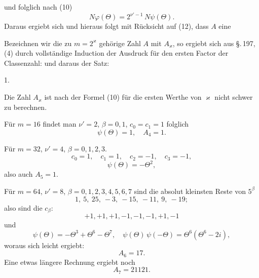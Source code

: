 und folglich nach (10)
\[
N\varphi(\Theta) = 2^{\nu'-1}\,N\psi(\Theta).
\]
Daraus ergiebt sich
und hieraus folgt mit Rücksicht auf (12), dass $A$ eine 

Bezeichnen wir die zu $m = 2^\varkappa$ gehörige Zahl $A$ mit $A_\varkappa$, so
ergiebt sich aus \S.\,197, (4) durch vollständige Induction der
Ausdruck für den ersten Factor der Classenzahl:
und daraus der Satz:

1. 

Die Zahl $A_\varkappa$ ist nach der Formel (10) für die ersten Werthe
von $\varkappa$ nicht schwer zu berechnen.

Für $m = 16$ findet man $\nu' = 2$, $\beta = 0, 1$, $c_0 = c_1 = 1$
folglich
\[
\psi(\Theta) = 1, \quad A_4 = 1.
\]

Für $m = 32$, $\nu' = 4$, $\beta = 0, 1, 2, 3$.
\[
c_0 = 1, \quad c_1 = 1, \quad c_2 = -1, \quad c_3 = -1,
\]
\[
\psi(\Theta) = -\Theta^2,
\]
also auch $A_5 = 1$.

Für $m = 64$, $\nu' = 8$, $\beta = 0, 1, 2, 3, 4, 5, 6, 7$ sind die
absolut kleinsten Reste von $5^\beta$
\[
1,\ 5,\ 25,\ -3,\ -15,\ -11,\ 9,\ -19;
\]
also sind die $c_\beta$:
\[
+1, +1, +1, -1, -1, -1, +1, -1
\]
und
\[
\psi(\Theta) = -\Theta^3 + \Theta^6 - \Theta^7, \quad \psi(\Theta)\,\psi(-\Theta) = \Theta^6(\Theta^6 - 2i),
\]
woraus sich leicht ergiebt:
\[
A_6 = 17.
\]
Eine etwas längere Rechnung ergiebt noch
\[
A_7 = 21121.
\]
